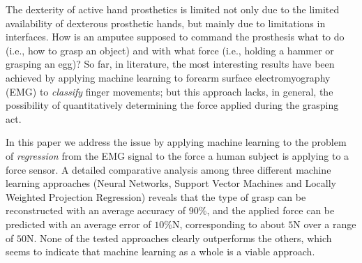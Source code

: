 The dexterity of active hand prosthetics is limited not only due
to the limited availability of dexterous prosthetic hands, but
mainly due to limitations in interfaces. How is an amputee
supposed to command the prosthesis what to do (i.e., how to grasp
an object) and with what force (i.e., holding a hammer or grasping
an egg)? So far, in literature, the most interesting results have
been achieved by applying machine learning to forearm surface
electromyography (EMG) to \emph{classify} finger movements; but
this approach lacks, in general, the possibility of quantitatively
determining the force applied during the grasping act.

In this paper we address the issue by applying machine learning to the
problem of \emph{regression} from the EMG signal to the force a human
subject is applying to a force sensor. A detailed comparative analysis
among three different machine learning approaches (Neural Networks,
Support Vector Machines and Locally Weighted Projection Regression)
reveals that the type of grasp can be reconstructed with an average
accuracy of $90\%$, and the applied force can be predicted with an
average error of $10\%$N, corresponding to about $5$N over a range of
$50$N. None of the tested approaches clearly outperforms the others,
which seems to indicate that machine learning as a whole is a viable
approach.
%
